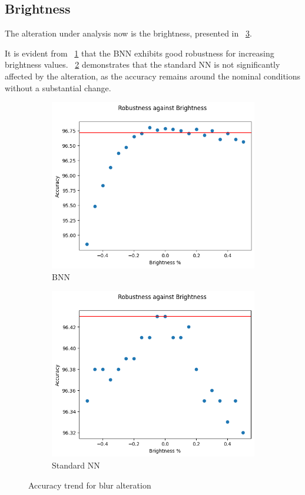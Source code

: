 \subsection{Brightness}

The alteration under analysis now is the brightness, presented in \Fig~\ref{fig:acc_br_wu}.

It is evident from \Fig~\ref{fig:br_acc_wu_bnn} that the BNN exhibits good robustness for increasing brightness values. \Fig~\ref{fig:brightness_ann} demonstrates that the standard NN is not significantly affected by the alteration, as the accuracy remains around the nominal conditions without a substantial change.

\begin{figure}[h]
	\centering
	\begin{subfigure}{.5\textwidth}
		\centering
		\includegraphics[width=0.9\linewidth]{ImageFiles/EvalBNN/BR/WU/acc}
		\caption{BNN}
		\label{fig:br_acc_wu_bnn}
	\end{subfigure}%
	\begin{subfigure}{.5\textwidth}
		\centering
		\includegraphics[width=0.9\linewidth]{ImageFiles/EvalANN/brightness_ann}
		\caption{Standard NN}
		\label{fig:brightness_ann}
	\end{subfigure}
	\caption{Accuracy trend for blur alteration}
	\label{fig:acc_br_wu}
\end{figure}


